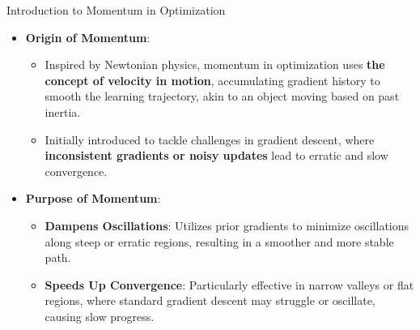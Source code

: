 \documentclass[serif, aspectratio=169]{beamer}
\begin{document}
\begin{frame}{Introduction to Momentum in Optimization}
    \begin{itemize}
        \item \textbf{Origin of Momentum}: 
        \begin{itemize}
            \item Inspired by Newtonian physics, momentum in optimization uses \textbf{the concept of velocity in motion}, accumulating gradient history to smooth the learning trajectory, akin to an object moving based on past inertia.
            \item Initially introduced to tackle challenges in gradient descent, where \textbf{inconsistent gradients or noisy updates} lead to erratic and slow convergence.
        \end{itemize}
        
        \item \textbf{Purpose of Momentum}: 
        \begin{itemize}
            \item \textbf{Dampens Oscillations}: Utilizes prior gradients to minimize oscillations along steep or erratic regions, resulting in a smoother and more stable path.
            \item \textbf{Speeds Up Convergence}: Particularly effective in narrow valleys or flat regions, where standard gradient descent may struggle or oscillate, causing slow progress.
        \end{itemize}
        
    \end{itemize}
\end{frame}
\end{document}
